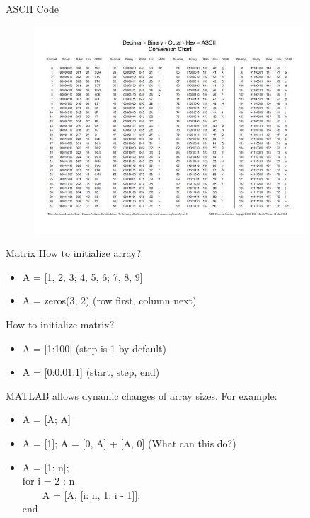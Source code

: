 \begin{frame}{ASCII Code}
\begin{figure}[htbp]
\centering
\includegraphics[width=0.9\textwidth]{pic/ascii.jpeg}
\end{figure}
\end{frame}

\begin{frame}{Matrix}
How to initialize array?
\begin{itemize}
\item A = [1, 2, 3; 4, 5, 6; 7, 8, 9]
\item A = zeros(3, 2) (row first, column next)
\end{itemize}
How to initialize matrix?
\begin{itemize}
\item A = [1:100] (step is 1 by default)
\item A = [0:0.01:1] (start, step, end)
\end{itemize}
MATLAB allows dynamic changes of array sizes. For example:
\begin{itemize}
\item A = [A; A]
\item A = [1]; A = [0, A] + [A, 0] (What can this do?)
\item A = [1: n];\\
	for i = 2 : n\\
	\ \ \ \ A = [A, [i: n, 1: i - 1]];\\
	end
\end{itemize}
\end{frame}

